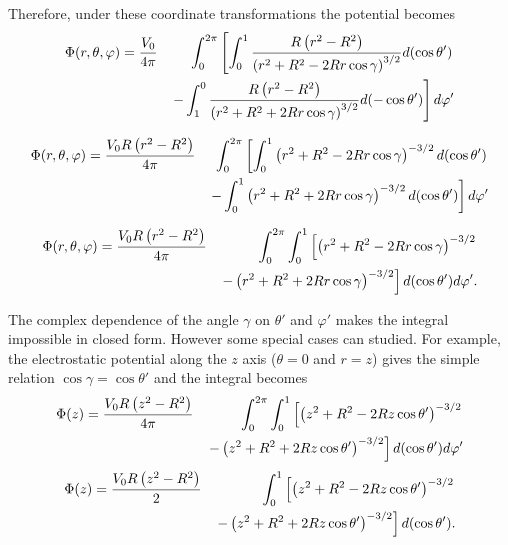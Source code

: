 Therefore, under these coordinate transformations the potential becomes
\begin{eqnarray}
\Phi (r, \theta, \varphi ) &= \frac{V_0}{4 \pi}   & \int_0^{2\pi}  \left[ \int_0^1   \frac{ R \left(  r^2- R^2 \right) }{  \left( r^2+ R^2- 2 Rr \cos \gamma \right)^{3/2} } d(\cos \theta ')\right. \notag \\ 
& & \left. -\int_{1}^0   \frac{ R \left(  r^2- R^2 \right) }{  \left( r^2+ R^2+ 2 Rr \cos \gamma \right)^{3/2} }  d(-\cos \theta ') \right] d \varphi ' \notag 
\end{eqnarray}

\begin{eqnarray}
\Phi (r, \theta, \varphi ) &= \frac{V_0 R \left(  r^2- R^2 \right)}{4 \pi}   & \int_0^{2\pi}  \left[ \int_0^1   \left( r^2+ R^2- 2 Rr \cos \gamma \right)^{-3/2}  d(\cos \theta ')\right. \notag \\ 
& & \left. -\int_{0}^1  \left( r^2+ R^2+ 2 Rr \cos \gamma \right)^{-3/2}  d(\cos \theta ') \right] d \varphi ' \notag 
\end{eqnarray}

\begin{eqnarray}
\Phi (r, \theta, \varphi ) &= \frac{V_0 R \left(  r^2- R^2 \right)}{4 \pi}   & \int_0^{2\pi}  \int_0^1   \left[ \left( r^2+ R^2- 2 Rr \cos \gamma \right)^{-3/2}  \right. \notag \\ 
& & \left. -  \left( r^2+ R^2+ 2 Rr \cos \gamma \right)^{-3/2}  \right]d(\cos \theta ')  d \varphi ' \notag .
\end{eqnarray}

The complex dependence of the angle $\gamma$ on $\theta '$ and $\varphi '$ makes the integral impossible in closed form. However some special cases can studied. For example, the electrostatic potential along the $z$ axis ($\theta = 0$  and $r=z$) gives the simple relation $\cos \gamma = \cos \theta '$ and the integral becomes
\begin{eqnarray}
\Phi (z ) &= \frac{V_0 R \left(  z^2- R^2 \right)}{4 \pi}   & \int_0^{2\pi}  \int_0^1   \left[ \left( z^2+ R^2- 2 Rz \cos \theta ' \right)^{-3/2}  \right. \notag \\ 
& & \left. -  \left( z^2+ R^2+ 2 Rz \cos \theta' \right)^{-3/2}  \right]d(\cos \theta ')  d \varphi ' \notag 
\end{eqnarray}
\begin{eqnarray}
\Phi (z ) &= \frac{V_0 R \left(  z^2- R^2 \right)}{2}   &   \int_0^1   \left[ \left( z^2+ R^2- 2 Rz \cos \theta ' \right)^{-3/2}  \right. \notag \\ 
& & \left. -  \left( z^2+ R^2+ 2 Rz \cos \theta' \right)^{-3/2}  \right]d(\cos \theta ') \notag .
\end{eqnarray}

